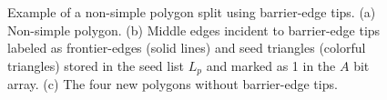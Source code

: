 \documentclass[lineno,pdflatex,sn-mathphys]{sn-jnl}%
\theoremstyle{thmstyleone}%
\theoremstyle{thmstyletwo}%
\theoremstyle{thmstylethree}%
\begin{document}
\begin{figure}[h]
\centering  
{}
\caption{Example of a non-simple polygon split using barrier-edge tips. (a) Non-simple polygon. (b) Middle edges incident to barrier-edge tips labeled  as frontier-edges (solid lines) and seed triangles (colorful triangles) stored in the seed list $L_p$ and marked as 1 in the $A$ bit array. (c) The four new polygons without barrier-edge tips.  }
\label{figs:splitmid} 
\end{figure}

\end{document}
